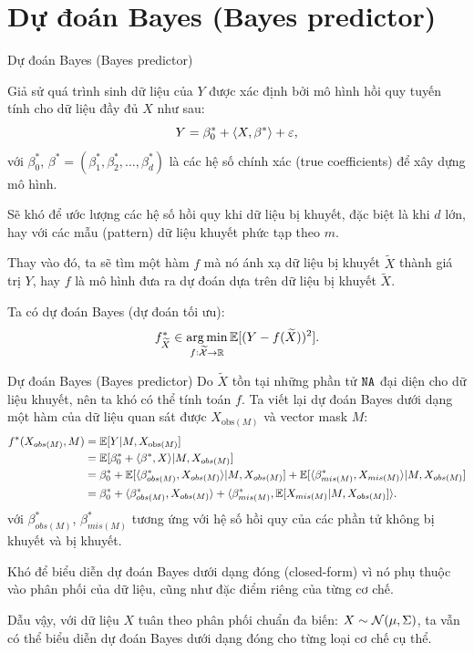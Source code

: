 \documentclass[aspectratio=169, 10pt]{beamer} %
\begin{document}
\section{Dự đoán Bayes (Bayes predictor)}
\begin{frame}{Dự đoán Bayes (Bayes predictor)}

    Giả sử quá trình sinh dữ liệu của $Y$ được xác định bởi mô hình hồi quy tuyến tính cho dữ liệu đầy đủ $X$ như sau:
    \begin{equation*}\label{eq:lr_matrix_notation}
        Y = \beta_0^* + \langle X, \beta^* \rangle + \varepsilon,
    \end{equation*}
    với $\beta_0^*$, $\beta^* = (\beta_1^*, \beta_2^*, \dots, \beta_d^*)$ là các hệ số chính xác (true coefficients) để xây dựng mô hình.
    
    
    \pause
    Sẽ khó để ước lượng các hệ số hồi quy khi dữ liệu bị khuyết, đặc biệt là khi $d$ lớn, hay với các mẫu (pattern) dữ liệu khuyết phức tạp theo $m$.
    \pause
    
    Thay vào đó, ta sẽ tìm một hàm $f$ mà nó ánh xạ dữ liệu 
    bị khuyết $\widetilde{X}$ 
    thành giá trị $Y$, hay $f$ là mô hình đưa ra dự đoán dựa trên dữ liệu 
    bị khuyết $\widetilde{X}$.

    \pause
    Ta có dự đoán Bayes (dự đoán tối ưu):
    \[
        f_{\widetilde{X}}^* \in \operatorname*{arg\,min}_{f: \widetilde{\mathcal{X}} \to \mathbb R} \mathbb{E} [(Y - f(\widetilde{X}))^2].
    \]
\end{frame}

\begin{frame}{Dự đoán Bayes (Bayes predictor)}
    Do $\widetilde{X}$ tồn tại những phần tử $\texttt{NA}$ đại diện cho dữ liệu khuyết, nên ta khó có thể tính toán $f$.
    Ta viết lại dự đoán Bayes dưới dạng
    một hàm của dữ liệu quan sát được $X_{\text{obs}(M)}$ và vector mask $M$:
    \begin{equation*}
        \begin{split}
        f^* (X_{obs(M)}, M) 
        &= \mathbb{E} [Y | M, X_{\text{obs}(M)}] \\
        &= \mathbb{E} [\beta_0^* + \langle \beta^*, X \rangle | M, X_{obs(M)}] \\
        &= \beta_0^* + \mathbb{E} [\langle \beta_{obs(M)}^*, X_{obs(M)} \rangle | M , X_{obs(M)}] + \mathbb{E} [\langle \beta_{mis(M)}^*, X_{mis(M)} \rangle | M , X_{obs(M)}] \\
        &= \beta_{0}^{*} + \langle\beta_{obs(M)}^{*}, X_{obs(M)}\rangle 
        + \langle\beta_{mis(M)}^{*}, \mathbb{E} [X_{mis(M)} | M, X_{obs(M)}] \rangle. 
        \end{split} 
    \end{equation*} 
    với $\beta_{obs(M)}^{*}$, $\beta_{mis(M)}^{*}$ tương ứng với hệ số hồi quy của các phần tử không bị khuyết và bị khuyết.
    
    \pause
    Khó để biểu diễn dự đoán Bayes dưới dạng đóng (closed-form) 
    vì nó phụ thuộc vào phân phối của dữ liệu, cũng như đặc điểm riêng của từng cơ chế.
    
    \pause
    Dẫu vậy, với dữ liệu $X$ tuân theo phân phối chuẩn đa biến: $X \sim \mathcal{N}(\mu, \Sigma)$, ta vẫn có thể biểu diễn dự đoán Bayes dưới dạng đóng cho từng loại cơ chế cụ thể. 
\end{frame}
\end{document}
